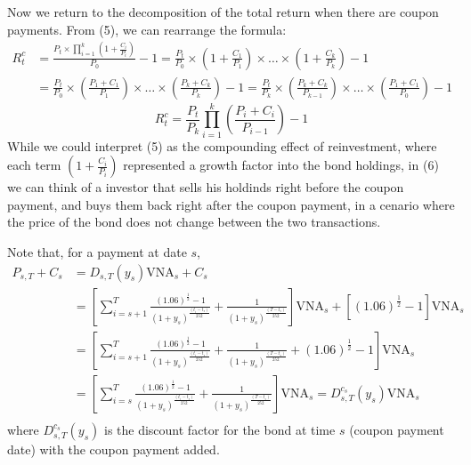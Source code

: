 \documentclass[10pt]{report}
\begin{document}
Now we return to the decomposition of the total return when there are coupon payments. From (5), we can rearrange the formula:
\begin{align*}
	R_{t}^{c} & = \frac{P_{t} \times \prod_{i=1}^{k} \left(1 + \frac{C_i}{P_i}\right)}{P_0} - 1
	= \frac{P_{t}}{P_0} \times \left(1 + \frac{C_1}{P_1} \right) \times \dots \times \left(1 + \frac{C_k}{P_k} \right) -1                                                                                                                                                \\
	          & = \frac{P_{t}}{P_0} \times \left(\frac{P_1 + C_1}{P_1} \right) \times \dots \times \left(\frac{P_k + C_k}{P_k} \right) - 1 = \frac{P_{t}}{P_k} \times \left(\frac{P_k + C_k}{P_{k-1}} \right) \times \dots \times \left(\frac{P_1 + C_1}{P_0} \right) -1
\end{align*}
\begin{equation}
	R_{t}^{c} = \frac{P_{t}}{P_k} \prod_{i=1}^{k} \left(\frac{P_i + C_i}{P_{i-1}} \right) - 1
\end{equation}
While we could interpret (5) as the compounding effect of reinvestment, where each term $ \left( 1 + \frac{C_i}{P_i} \right) $ represented a growth factor into the bond holdings, in (6) we can think of a investor that sells his holdinds right before the coupon payment, and buys them back right after the coupon payment, in a cenario where the price of the bond does not change between the two transactions.

Note that, for a payment at date $ s $,
\begin{align*}
	P_{s,T} + C_s & = D_{s,T}(y_s) \text{VNA}_{s} + C_s                                                                                                                                                                              \\
	              & = \left[\sum_{i=s+1}^{T} \frac{(1.06)^{\frac{1}{2}}-1}{(1+y_{s})^\frac{(t_{i}-t_s)}{252}} + \frac{1}{(1+y_{s})^\frac{(T-t_s)}{252}}\right] \text{VNA}_{s} + \left[(1.06)^{\frac{1}{2}} -1 \right] \text{VNA}_{s} \\
	              & = \left[\sum_{i=s+1}^{T} \frac{(1.06)^{\frac{1}{2}}-1}{(1+y_{s})^\frac{(t_{i}-t_s)}{252}} + \frac{1}{(1+y_{s})^\frac{(T-t_s)}{252}}+ (1.06)^{\frac{1}{2}}-1\right] \text{VNA}_{s}                                \\
	              & = \left[\sum_{i=s}^{T} \frac{(1.06)^{\frac{1}{2}}-1}{(1+y_{s})^\frac{(t_{i}-t_s)}{252}} + \frac{1}{(1+y_{s})^\frac{(T-t_s)}{252}}\right] \text{VNA}_{s} = D_{s,T}^{c_{s}}(y_{s}) \text{VNA}_{s}                  \\
\end{align*}
where $D_{s,T}^{c_{s}}(y_{s})$ is the discount factor for the bond at time $ s $ (coupon payment date) with the coupon payment added.
\end{document}
